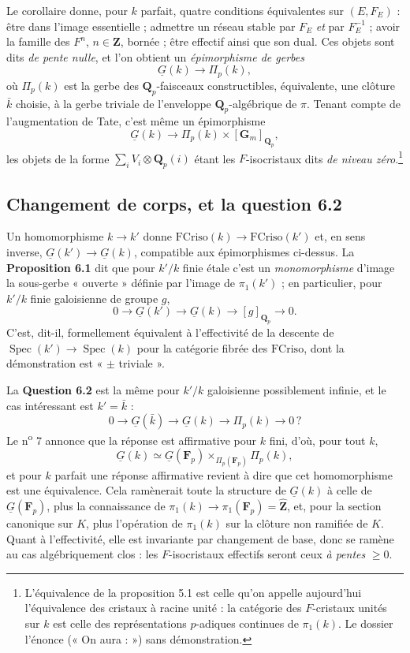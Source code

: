 \documentclass[11pt,a4paper]{article}
\begin{document}
Le corollaire donne, pour $k$ parfait, quatre conditions équivalentes sur
$(E,F_{E})$ : être dans l'image essentielle ; admettre un réseau stable par
$F_{E}$ \emph{et} par $F_{E}^{-1}$ ; avoir la famille des $F^{n}$, $n \in
\mathbf{Z}$, bornée ; être effectif ainsi que son dual. Ces objets sont dits
\emph{de pente nulle}, et l'on obtient un \emph{épimorphisme de gerbes}
\[
\underline{G}(k) \longrightarrow \Pi_{p}(k) ,
\]
où $\Pi_{p}(k)$ est la gerbe des $\mathbf{Q}_{p}$-faisceaux constructibles,
équivalente, une clôture $\bar{k}$ choisie, à la gerbe triviale de
l'enveloppe $\mathbf{Q}_{p}$-algébrique de $\pi$. Tenant compte de
l'augmentation de Tate, c'est même un épimorphisme
\[
\underline{G}(k) \longrightarrow \Pi_{p}(k) \times
[\mathbf{G}_{m}]_{\mathbf{Q}_{p}} ,
\]
les objets de la forme $\sum_{i} V_{i} \otimes \mathbf{Q}_{p}(i)$ étant les
$F$-isocristaux dits \emph{de niveau zéro}.\footnote{L'équivalence de la
proposition 5.1 est celle qu'on appelle aujourd'hui l'équivalence des cristaux
à racine unité : la catégorie des $F$-cristaux unités sur $k$ est celle des
représentations $p$-adiques continues de $\pi_{1}(k)$. Le dossier l'énonce
(« On aura : ») sans démonstration.}

\subsection*{Changement de corps, et la question 6.2}

Un homomorphisme $k \to k'$ donne $\mathrm{FCriso}(k) \to \mathrm{FCriso}(k')$
et, en sens inverse, $\underline{G}(k') \to \underline{G}(k)$, compatible aux
épimorphismes ci-dessus. La \textbf{Proposition 6.1} dit que pour $k'/k$ finie
étale c'est un \emph{monomorphisme} d'image la sous-gerbe « ouverte » définie
par l'image de $\pi_{1}(k')$ ; en particulier, pour $k'/k$ finie galoisienne de
groupe $g$,
\[
0 \longrightarrow \underline{G}(k') \longrightarrow \underline{G}(k)
\longrightarrow [g]_{\mathbf{Q}_{p}} \longrightarrow 0 .
\]
C'est, dit-il, formellement équivalent à l'effectivité de la descente de
$\operatorname{Spec}(k') \to \operatorname{Spec}(k)$ pour la catégorie fibrée
des $\mathrm{FCriso}$, dont la démonstration est « $\pm$ triviale ».

La \textbf{Question 6.2} est la même pour $k'/k$ galoisienne possiblement
infinie, et le cas intéressant est $k' = \bar{k}$ :
\[
0 \longrightarrow \underline{G}(\bar{k}) \longrightarrow \underline{G}(k)
\longrightarrow \Pi_{p}(k) \longrightarrow 0 \, ?
\]
Le n\textsuperscript{o} 7 annonce que la réponse est affirmative pour $k$ fini,
d'où, pour tout $k$,
\[
\underline{G}(k) \simeq \underline{G}(\mathbf{F}_{p})
\times_{\Pi_{p}(\mathbf{F}_{p})} \Pi_{p}(k) ,
\]
et pour $k$ parfait une réponse affirmative revient à dire que cet
homomorphisme est une équivalence. Cela ramènerait toute la structure de
$\underline{G}(k)$ à celle de $\underline{G}(\mathbf{F}_{p})$, plus la
connaissance de $\pi_{1}(k) \to \pi_{1}(\mathbf{F}_{p}) = \hat{\mathbf{Z}}$,
et, pour la section canonique sur $K$, plus l'opération de $\pi_{1}(k)$ sur la
clôture non ramifiée de $K$. Quant à l'effectivité, elle est invariante par
changement de base, donc se ramène au cas algébriquement clos : les
$F$-isocristaux effectifs seront ceux \emph{à pentes} $\geqslant 0$.
\end{document}
